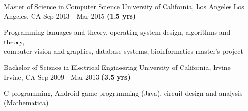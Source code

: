 

\begin{cventries}

  \cventry
    {Master of Science in Computer Science} %
    {University of California, Los Angeles} %
    {Los Angeles, CA} %
    {Sep 2013 - Mar 2015 \textbf{(1.5 yrs)}} %
    {
      \begin{cvitems} %
        \item {Programming lanuages and theory, operating system design, algorithms and theory,\\ computer vision and graphics, database systems, bioinformatics master's project}
      \end{cvitems}
    }

  \cventry
    {Bachelor of Science in Electrical Engineering} %
    {University of California, Irvine} %
    {Irvine, CA} %
    {Sep 2009 - Mar 2013 \textbf{(3.5 yrs)}} %
    {
      \begin{cvitems} %
        \item {C programming, Android game programming (Java), circuit design and analysis (Mathematica)}
      \end{cvitems}
    }
\end{cventries}

